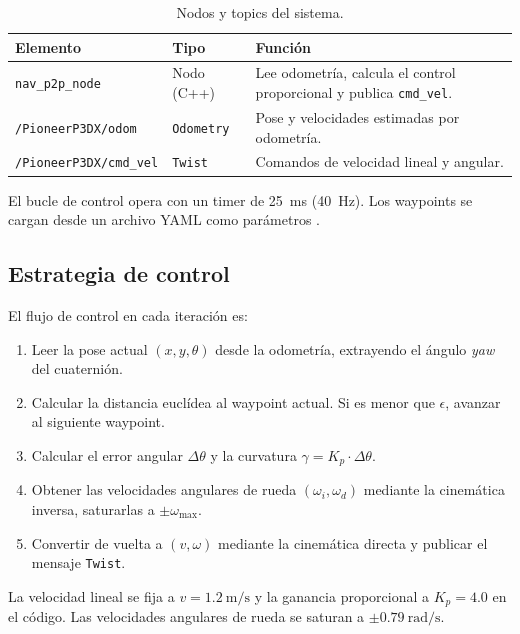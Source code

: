 \documentclass[12pt]{article}
\begin{document}
\begin{table}[H]
  \centering
  \caption{Nodos y topics \ros{} del sistema.}
  \label{tab:nodos}
  \begin{tabularx}{0.98\linewidth}{l l X}
    \toprule
    \textbf{Elemento} & \textbf{Tipo} & \textbf{Funci\'{o}n} \\
    \midrule
    \texttt{nav\_p2p\_node}           & Nodo (C++) & Lee odometr\'{i}a, calcula el control proporcional y publica \texttt{cmd\_vel}. \\
    \texttt{/PioneerP3DX/odom}       & \texttt{Odometry}  & Pose y velocidades estimadas por odometr\'{i}a. \\
    \texttt{/PioneerP3DX/cmd\_vel}   & \texttt{Twist}     & Comandos de velocidad lineal y angular. \\
    \bottomrule
  \end{tabularx}
\end{table}

El bucle de control opera con un timer de \SI{25}{\milli\second} (40~Hz). Los waypoints se cargan desde un archivo YAML como par\'{a}metros \ros{}.

\subsection{Estrategia de control}
El flujo de control en cada iteraci\'{o}n es:

\begin{enumerate}[leftmargin=2em]
  \item Leer la pose actual $(x, y, \theta)$ desde la odometr\'{i}a, extrayendo el \'{a}ngulo \emph{yaw} del cuaterni\'{o}n.
  \item Calcular la distancia eucl\'{i}dea al waypoint actual. Si es menor que $\epsilon$, avanzar al siguiente waypoint.
  \item Calcular el error angular $\Delta\theta$ y la curvatura $\gamma = K_p \cdot \Delta\theta$.
  \item Obtener las velocidades angulares de rueda $(\omega_i, \omega_d)$ mediante la cinem\'{a}tica inversa, saturarlas a $\pm\omega_\text{max}$.
  \item Convertir de vuelta a $(v, \omega)$ mediante la cinem\'{a}tica directa y publicar el mensaje \texttt{Twist}.
\end{enumerate}

La velocidad lineal se fija a $v = \SI{1.2}{\meter\per\second}$ y la ganancia proporcional a $K_p = 4.0$ en el c\'{o}digo. Las velocidades angulares de rueda se saturan a $\pm\SI{0.79}{\radian\per\second}$.
\end{document}
